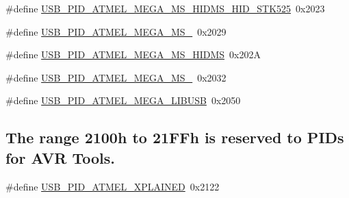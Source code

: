 \begin{DoxyCompactItemize}
\item 
\#define \hyperlink{group__usb__atmel__ids__group_ga56d6948e6453977046c3fb85e0ff8f48}{\-U\-S\-B\-\_\-\-P\-I\-D\-\_\-\-A\-T\-M\-E\-L\-\_\-\-M\-E\-G\-A\-\_\-\-M\-S\-\_\-\-H\-I\-D\-M\-S\-\_\-\-H\-I\-D\-\_\-\-S\-T\-K525}~0x2023
\item 
\#define \hyperlink{group__usb__atmel__ids__group_gab485e4b690d9238e96d1b7bb76e76237}{\-U\-S\-B\-\_\-\-P\-I\-D\-\_\-\-A\-T\-M\-E\-L\-\_\-\-M\-E\-G\-A\-\_\-\-M\-S\-\_}~0x2029
\item 
\#define \hyperlink{group__usb__atmel__ids__group_ga9212dd62110d78c0ba313dbc93178de6}{\-U\-S\-B\-\_\-\-P\-I\-D\-\_\-\-A\-T\-M\-E\-L\-\_\-\-M\-E\-G\-A\-\_\-\-M\-S\-\_\-\-H\-I\-D\-M\-S}~0x202\-A
\item 
\#define \hyperlink{group__usb__atmel__ids__group_ga7c7d2af4b6241c33e3addd3573e4d542}{\-U\-S\-B\-\_\-\-P\-I\-D\-\_\-\-A\-T\-M\-E\-L\-\_\-\-M\-E\-G\-A\-\_\-\-M\-S\-\_}~0x2032
\item 
\#define \hyperlink{group__usb__atmel__ids__group_ga5dd1ecf3da98d83961de2f5de443e1c5}{\-U\-S\-B\-\_\-\-P\-I\-D\-\_\-\-A\-T\-M\-E\-L\-\_\-\-M\-E\-G\-A\-\_\-\-L\-I\-B\-U\-S\-B}~0x2050
\end{DoxyCompactItemize}
\subsection*{\-The range 2100h to 21\-F\-Fh is reserved to \-P\-I\-Ds for \-A\-V\-R \-Tools.}
\begin{DoxyCompactItemize}
\item 
\#define \hyperlink{group__usb__atmel__ids__group_ga482b37d2c4bd42852c448308f5e864fd}{\-U\-S\-B\-\_\-\-P\-I\-D\-\_\-\-A\-T\-M\-E\-L\-\_\-\-X\-P\-L\-A\-I\-N\-E\-D}~0x2122
\end{DoxyCompactItemize}
